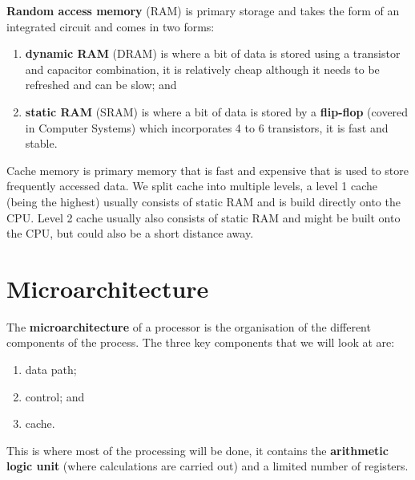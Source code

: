 \begin{definition}[RAM]
    \textbf{Random access memory} (RAM) is primary storage and takes the form of an integrated circuit and comes in two forms:
    \begin{enumerate}
        \item \textbf{dynamic RAM} (DRAM) is where a bit of data is stored using a transistor and capacitor combination, it is relatively cheap although it needs to be refreshed and can be slow; and
        \item \textbf{static RAM} (SRAM) is where a bit of data is stored by a \textbf{flip-flop} (covered in Computer Systems) which incorporates 4 to 6 transistors, it is fast and stable.
    \end{enumerate}
\end{definition}

\begin{definition}[Caches]
    Cache memory is primary memory that is fast and expensive that is used to store frequently accessed data. We split cache into multiple levels, a level 1 cache (being the highest) usually consists of static RAM and is build directly onto the CPU. Level 2 cache usually also consists of static RAM and might be built onto the CPU, but could also be a short distance away. 
\end{definition}

\section{Microarchitecture}

\begin{definition}[Microarchitecture]
    The \textbf{microarchitecture} of a processor is the organisation of the different components of the process. The three key components that we will look at are:
    \begin{enumerate}
        \item data path;
        \item control; and
        \item cache.
    \end{enumerate}
\end{definition}

\begin{definition}[Datapath]
    This is where most of the processing will be done, it contains the \textbf{arithmetic logic unit} (where calculations are carried out) and a limited number of registers.
\end{definition}

